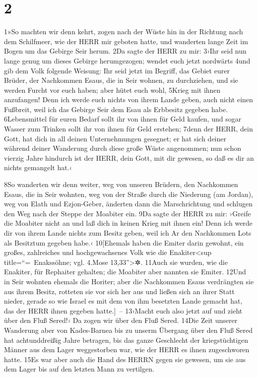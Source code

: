 \hypertarget{section-1}{%
\section{2}\label{section-1}}

1»So machten wir denn kehrt, zogen nach der Wüste hin in der Richtung
nach dem Schilfmeer, wie der HERR mir geboten hatte, und wanderten lange
Zeit im Bogen um das Gebirge Seir herum. 2Da sagte der HERR zu mir:
3›Ihr seid nun lange genug um dieses Gebirge herumgezogen; wendet euch
jetzt nordwärts 4und gib dem Volk folgende Weisung: Ihr seid jetzt im
Begriff, das Gebiet eurer Brüder, der Nachkommen Esaus, die in Seir
wohnen, zu durchziehen, und sie werden Furcht vor euch haben; aber hütet
euch wohl, 5Krieg mit ihnen anzufangen! Denn ich werde euch nichts von
ihrem Lande geben, auch nicht einen Fußbreit, weil ich das Gebirge Seir
dem Esau als Erbbesitz gegeben habe. 6Lebensmittel für euren Bedarf
sollt ihr von ihnen für Geld kaufen, und sogar Wasser zum Trinken sollt
ihr von ihnen für Geld erstehen; 7denn der HERR, dein Gott, hat dich in
all deinen Unternehmungen gesegnet; er hat sich deiner während deiner
Wanderung durch diese große Wüste angenommen; nun schon vierzig Jahre
hindurch ist der HERR, dein Gott, mit dir gewesen, so daß es dir an
nichts gemangelt hat.‹

8So wanderten wir denn weiter, weg von unseren Brüdern, den Nachkommen
Esaus, die in Seir wohnten, weg von der Straße durch die Niederung (am
Jordan), weg von Elath und Ezjon-Geber, änderten dann die Marschrichtung
und schlugen den Weg nach der Steppe der Moabiter ein. 9Da sagte der
HERR zu mir: ›Greife die Moabiter nicht an und laß dich in keinen Krieg
mit ihnen ein! Denn ich werde dir von ihrem Lande nichts zum Besitz
geben, weil ich Ar den Nachkommen Lots als Besitztum gegeben habe.‹
10{[}Ehemals haben die Emiter darin gewohnt, ein großes, zahlreiches und
hochgewachsenes Volk wie die Enakiter\textless sup title=``=~Enakssöhne;
vgl. 4.Mose 13,33''\textgreater✲. 11Auch sie wurden, wie die Enakiter,
für Rephaiter gehalten; die Moabiter aber nannten sie Emiter. 12Und in
Seir wohnten ehemals die Horiter; aber die Nachkommen Esaus verdrängten
sie aus ihrem Besitz, rotteten sie vor sich her aus und ließen sich an
ihrer Statt nieder, gerade so wie Israel es mit dem von ihm besetzten
Lande gemacht hat, das der HERR ihnen gegeben hatte.{]}~-- 13›Macht euch
also jetzt auf und zieht über den Fluß Sered!‹ Da zogen wir über den
Fluß Sered. 14Die Zeit unserer Wanderung aber von Kades-Barnea bis zu
unserm Übergang über den Fluß Sered hat achtunddreißig Jahre betragen,
bis das ganze Geschlecht der kriegstüchtigen Männer aus dem Lager
weggestorben war, wie der HERR es ihnen zugeschworen hatte. 15Es war
aber auch die Hand des HERRN gegen sie gewesen, um sie aus dem Lager bis
auf den letzten Mann zu vertilgen.

